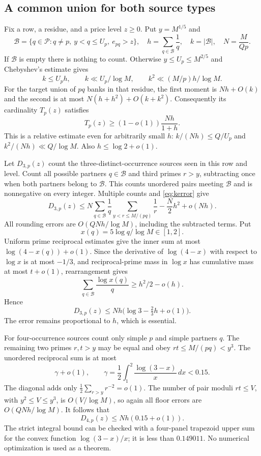 \documentclass[11pt,a4paper]{article}
\newcommand{\Pset}{\mathcal P}
\begin{document}
\subsection{A common union for both source types}
Fix a row, a residue, and a price level $z\ge0$. Put $y=M^{1/5}$ and
\[
 \mathcal B=\{q\in\Pset:q\ne p,\ y<q\le U_p,\ e_{pq}>z\},
 \quad h=\sum_{q\in\mathcal B}\frac1q,\quad k=|\mathcal B|,
 \quad N=\frac{M}{Qp}.
\]
If $\mathcal B$ is empty there is nothing to count. Otherwise
$y\le U_p\le M^{2/5}$ and Chebyshev's estimate gives
\begin{equation}
 k\le U_ph,\qquad k\ll U_p/\log M,\qquad
 k^2\ll (M/p)h/\log M.                              \label{eq:kerror}
\end{equation}
For the target union of $pq$ banks in that residue, the first moment is
$Nh+O(k)$ and the second is at most $N(h+h^2)+O(k+k^2)$.
Consequently its cardinality $T_p(z)$ satisfies
\begin{equation}
 T_p(z)\ge(1-o(1))\frac{Nh}{1+h}.                     \label{eq:union}
\end{equation}
This is a relative estimate even for arbitrarily small $h$:
$k/(Nh)\le Q/U_p$ and $k^2/(Nh)\ll Q/\log M$. Also
$h\le\log2+o(1)$.

Let $D_{3,p}(z)$ count the three-distinct-occurrence sources seen in
this row and level. Count all possible partners $q\in\mathcal B$ and
third primes $r>y$, subtracting once when both partners belong to
$\mathcal B$. This counts unordered pairs meeting $\mathcal B$ and
is nonnegative on every integer. Multiple counts and
\eqref{eq:kerror} give
\[
 D_{3,p}(z)\le N\sum_{q\in\mathcal B}\frac1q
                    \sum_{y<r\le M/(pq)}\frac1r
                     -\frac N2h^2+o(Nh).
\]
All rounding errors are $O(QNh/\log M)$, including the subtracted
terms. Put
\[
 x(q)=5\log q/\log M\in[1,2].
\]
Uniform prime reciprocal estimates give the inner sum at most
$\log(4-x(q))+o(1)$.
Since the derivative of $\log(4-x)$ with respect to $\log x$ is
at most $-1/3$, and reciprocal-prime mass in $\log x$ has cumulative
mass at most $t+o(1)$, rearrangement gives
\[
 \sum_{q\in\mathcal B}\frac{\log x(q)}q\ge h^2/2-o(h).
\]
Hence
\begin{equation}
 D_{3,p}(z)\le Nh\bigl(\log3-\tfrac23h+o(1)\bigr).    \label{eq:D3}
\end{equation}
The error remains proportional to $h$, which is essential.

For four-occurrence sources count only simple $p$ and simple partners
$q$. The remaining two primes $r,t>y$ may be equal and obey
$rt\le M/(pq)<y^3$. The unordered reciprocal sum is at most
\[
 \gamma+o(1),\qquad
 \gamma=\frac12\int_1^2\frac{\log(3-x)}x\,dx<0.15.
\]
The diagonal adds only $\frac12\sum_{r>y}r^{-2}=o(1)$. The number
of pair moduli $rt\le V$, with $y^2\le V\le y^3$, is
$O(V/\log M)$, so again all floor errors are $O(QNh/\log M)$.
It follows that
\begin{equation}
 D_{4,p}(z)\le Nh(0.15+o(1)).                          \label{eq:D4}
\end{equation}
The strict integral bound can be checked with a four-panel trapezoid
upper sum for the convex function $\log(3-x)/x$; it is less than
$0.149011$. No numerical optimization is used as a theorem.
\end{document}
